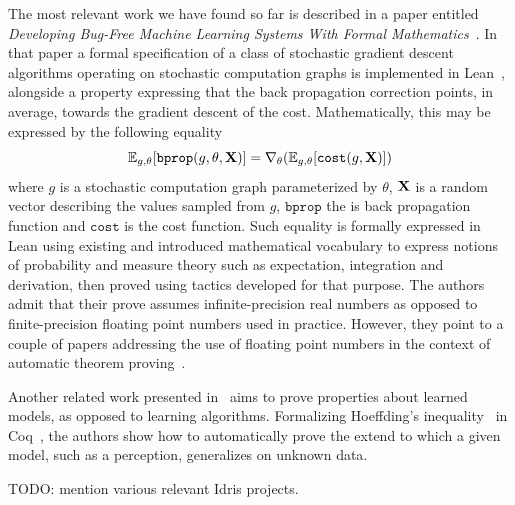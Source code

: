 \documentclass[]{report}
\begin{document}
The most relevant work we have found so far is described in a paper
entitled \emph{Developing Bug-Free Machine Learning Systems With
  Formal Mathematics}~\cite{DBLP:journals/corr/SelsamLD17}.  In that
paper a formal specification of a class of stochastic gradient descent
algorithms operating on stochastic computation graphs is implemented
in Lean~\cite{Lean}, alongside a property expressing that the back
propagation correction points, in average, towards the gradient
descent of the cost.  Mathematically, this may be expressed by the
following equality
$$\mathbb{E}_{g,\theta}[\texttt{bprop}(g,\theta,\bold{X})] = \nabla_{\theta}(\mathbb{E}_{g,\theta}[\texttt{cost}(g,\bold{X})])$$
where $g$ is a stochastic computation graph parameterized by $\theta$,
$\bold{X}$ is a random vector describing the values sampled from $g$,
$\texttt{bprop}$ the is back propagation function and $\texttt{cost}$
is the cost function.  Such equality is formally expressed in Lean
using existing and introduced mathematical vocabulary to express
notions of probability and measure theory such as expectation,
integration and derivation, then proved using tactics developed for
that purpose.  The authors admit that their prove assumes
infinite-precision real numbers as opposed to finite-precision
floating point numbers used in practice.  However, they point to a
couple of papers addressing the use of floating point numbers in the
context of automatic theorem proving~\cite{Harrison2006,
  Ramananandro2016}.

Another related work presented in~\cite{Bagnall2019} aims to prove
properties about learned models, as opposed to learning algorithms.
Formalizing Hoeffding's inequality~\cite{Hoeffding1963} in
Coq~\cite{Bertot2004}, the authors show how to automatically prove the
extend to which a given model, such as a perception, generalizes on
unknown data.

TODO: mention various relevant Idris projects.

\end{document}
